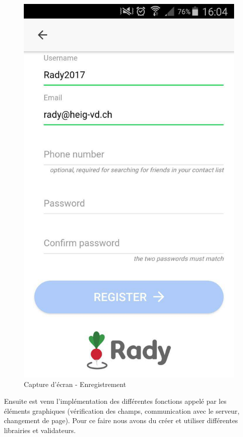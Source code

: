 \documentclass[french]{article}
\begin{document}
	\begin{figure}[H]
		\centering
		\includegraphics[scale=0.20]{../screenshot/screenshot-register.jpg}
		\caption{Capture d'écran - Enregistrement}
		\label{Capture d'écran - Enregistrement}
	\end{figure} 	 
	
	\newpage
	
	Ensuite est venu l'implémentation des différentes fonctions appelé par les éléments graphiques (vérification des champs, communication avec le serveur, changement de page). Pour ce faire nous avons du créer et utiliser différentes librairies et validateurs.
	
\end{document}
